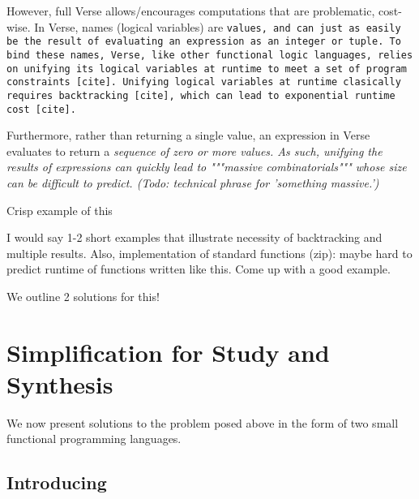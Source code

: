 \documentclass[manuscript,screen,review, 12pt]{acmart}
\begin{document}
\begin{outline}[enumerate]


    

    However, full Verse allows/encourages computations that are problematic,
    cost-wise. In Verse, names (logical variables) are \tt{values}, and can just
    as easily be the result of evaluating an expression as an integer or tuple.
    To bind these names, Verse, like other functional logic languages, relies on
    unifying its logical variables at runtime to meet a set of program
    constraints [cite]. Unifying logical variables at runtime clasically
    requires backtracking [cite], which can lead to exponential runtime cost
    [cite]. 
        
    Furthermore, rather than returning a single value, an expression in Verse
    evaluates to return a \it{sequence} of zero or more values. As such,
    unifying the results of expressions can quickly lead to """massive
    combinatorials""" whose size can be difficult to predict. (Todo: technical phrase for 'something massive.') 


    \2 Crisp example of this 

    \3 I would say 1-2 short examples that illustrate necessity of backtracking  and multiple results. Also, implementation of standard functions (zip):  maybe hard to predict runtime of functions written like this. Come up with a good example. 

    \3 We outline 2 solutions for this! 

    \end{outline}
\section{Simplification for Study and Synthesis}

We now present solutions to the problem posed above in the form of two small
functional programming languages. %

\subsection{Introducing \PPlus\ }
\end{document}

